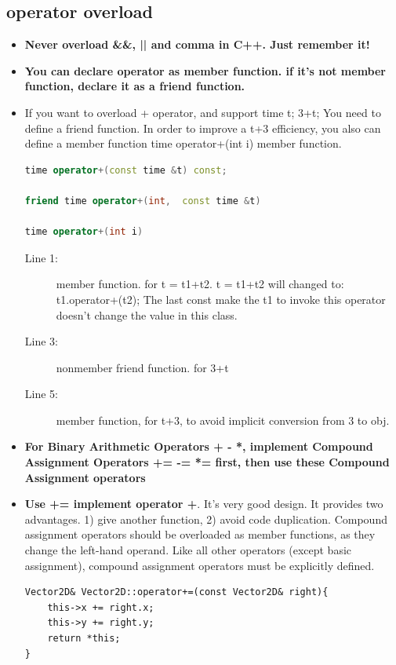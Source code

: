 \documentclass[a4paper,11pt,twoside]{book}
\begin{document}
\subsection{operator overload}
\begin{itemize}
	\item \textbf{Never overload \&\&, || and comma in C++.  Just remember it!}
	
	\item \textbf{You can declare operator as member function. if it's not member function, declare it as a friend function.}
	
		\item If you want to overload + operator, and support time t; 3+t;   You need to define a friend function. In order to improve a t+3 efficiency, you also can define a member function time operator+(int i) member function.
\begin{lstlisting}[frame=single, language=c++]
time operator+(const time &t) const;

friend time operator+(int,  const time &t)

time operator+(int i)
\end{lstlisting}
\begin{description}
	\item[Line 1:] member function. for t = t1+t2. t = t1+t2 will changed to:  t1.operator+(t2);  The last const make the t1 to invoke this operator doesn't change the value in this class. 
	
	\item[Line 3:] nonmember friend function. for 3+t
	
	\item[Line 5:] member function, for t+3, to avoid implicit conversion from 3 to obj.
\end{description}
	
	\item \textbf{For Binary Arithmetic Operators + - *, implement Compound Assignment Operators += -= *= first, then use these Compound Assignment operators}
	
	\item \textbf{Use += implement operator +}. It's very good design. It provides two advantages. 1) give another function, 2) avoid code duplication. Compound assignment operators should be overloaded as member functions, as they change the left-hand operand. Like all other operators (except basic assignment), compound assignment operators must be explicitly defined. 
\begin{lstlisting}[numbers=none]
Vector2D& Vector2D::operator+=(const Vector2D& right){
	this->x += right.x;
	this->y += right.y;
	return *this;
}
\end{lstlisting}
	

\end{itemize}
\end{document}

